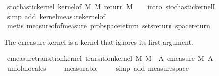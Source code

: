 \begin{isabellebody}
%
\endisatagproof
{\isafoldproof}%
%
\isadelimproof
\isanewline
%
\endisadelimproof
\isanewline
{}\isamarkupfalse%
\ {\isachardoublequoteopen}stochastic{\isacharunderscore}{\kern0pt}kernel\ {\isacharparenleft}{\kern0pt}kernel{\isacharunderscore}{\kern0pt}of\ M\ M\ {\isacharparenleft}{\kern0pt}return\ M{\isacharparenright}{\kern0pt}{\isacharparenright}{\kern0pt}{\isachardoublequoteclose}\isanewline
%
\isadelimproof
\ \ %
\endisadelimproof
%
\isatagproof
{}\isamarkupfalse%
\ {\isacharparenleft}{\kern0pt}intro\ stochastic{\isacharunderscore}{\kern0pt}kernelI{\isacharparenright}{\kern0pt}\isanewline
\ \ \isamarkupfalse%
\ {\isacharparenleft}{\kern0pt}simp\ add{\isacharcolon}{\kern0pt}\ kernel{\isacharunderscore}{\kern0pt}measure{\isacharunderscore}{\kern0pt}kernel{\isacharunderscore}{\kern0pt}of{\isacharparenright}{\kern0pt}\isanewline
\ \ \isamarkupfalse%
\ {\isacharparenleft}{\kern0pt}metis\ measure{\isacharunderscore}{\kern0pt}of{\isacharunderscore}{\kern0pt}of{\isacharunderscore}{\kern0pt}measure\ prob{\isacharunderscore}{\kern0pt}space{\isacharunderscore}{\kern0pt}return\ sets{\isacharunderscore}{\kern0pt}return\ space{\isacharunderscore}{\kern0pt}return{\isacharparenright}{\kern0pt}\isanewline
\ \ \isamarkupfalse%
%
\endisatagproof
{\isafoldproof}%
%
\isadelimproof
%
\endisadelimproof
%
\begin{isamarkuptext}%
The emeasure kernel is a kernel that ignores its first argument.%
\end{isamarkuptext}\isamarkuptrue%
\isamarkupfalse%
\ emeasure{\isacharunderscore}{\kern0pt}transition{\isacharunderscore}{\kern0pt}kernel{\isacharcolon}{\kern0pt}\ {\isachardoublequoteopen}transition{\isacharunderscore}{\kern0pt}kernel\ M\ M{\isacharprime}{\kern0pt}\ {\isacharparenleft}{\kern0pt}{\isasymlambda}{\isasymomega}\ A{\isachardot}{\kern0pt}\ emeasure\ M{\isacharprime}{\kern0pt}\ A{\isacharparenright}{\kern0pt}{\isachardoublequoteclose}\isanewline
%
\isadelimproof
\ \ %
\endisadelimproof
%
\isatagproof
{}\isamarkupfalse%
\ unfold{\isacharunderscore}{\kern0pt}locales\isanewline
\ \ \ \isamarkupfalse%
\ measurable\isanewline
\ \ \ \isamarkupfalse%
\ {\isacharparenleft}{\kern0pt}simp\ add{\isacharcolon}{\kern0pt}\ measure{\isacharunderscore}{\kern0pt}space{\isacharparenright}{\kern0pt}\isanewline
\ \ \isamarkupfalse%
%
\endisatagproof
{\isafoldproof}%
%
\isadelimproof
\isanewline
%
\endisadelimproof
\isanewline
{}\isamarkupfalse%

\end{isabellebody}
